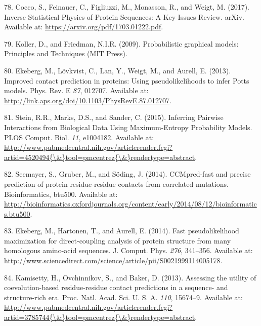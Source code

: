 \documentclass[12pt,a4paper,twoside]{book}
\theoremstyle{definition}
\theoremstyle{definition}
\theoremstyle{remark}
\begin{document}
\hypertarget{ref-Cocco2017}{}
78. Cocco, S., Feinauer, C., Figliuzzi, M., Monasson, R., and Weigt, M.
(2017). Inverse Statistical Physics of Protein Sequences: A Key Issues
Review. arXiv. Available at: \url{https://arxiv.org/pdf/1703.01222.pdf}.

\hypertarget{ref-Koller2009}{}
79. Koller, D., and Friedman, N.I.R. (2009). Probabilistic graphical
models: Principles and Techniques (MIT Press).

\hypertarget{ref-Ekeberg2013}{}
80. Ekeberg, M., Lövkvist, C., Lan, Y., Weigt, M., and Aurell, E.
(2013). Improved contact prediction in proteins: Using pseudolikelihoods
to infer Potts models. Phys. Rev. E \emph{87}, 012707. Available at:
\url{http://link.aps.org/doi/10.1103/PhysRevE.87.012707}.

\hypertarget{ref-Stein2015a}{}
81. Stein, R.R., Marks, D.S., and Sander, C. (2015). Inferring Pairwise
Interactions from Biological Data Using Maximum-Entropy Probability
Models. PLOS Comput. Biol. \emph{11}, e1004182. Available at:
\href{http://www.pubmedcentral.nih.gov/articlerender.fcgi?artid=4520494\%7B/\&\%7Dtool=pmcentrez\%7B/\&\%7Drendertype=abstract}{http://www.pubmedcentral.nih.gov/articlerender.fcgi?artid=4520494\{\textbackslash{}\&\}tool=pmcentrez\{\textbackslash{}\&\}rendertype=abstract}.

\hypertarget{ref-Seemayer2014}{}
82. Seemayer, S., Gruber, M., and Söding, J. (2014). CCMpred-fast and
precise prediction of protein residue-residue contacts from correlated
mutations. Bioinformatics, btu500. Available at:
\url{http://bioinformatics.oxfordjournals.org/content/early/2014/08/12/bioinformatics.btu500}.

\hypertarget{ref-Ekeberg2014}{}
83. Ekeberg, M., Hartonen, T., and Aurell, E. (2014). Fast
pseudolikelihood maximization for direct-coupling analysis of protein
structure from many homologous amino-acid sequences. J. Comput. Phys.
\emph{276}, 341--356. Available at:
\url{http://www.sciencedirect.com/science/article/pii/S0021999114005178}.

\hypertarget{ref-Kamisetty2013}{}
84. Kamisetty, H., Ovchinnikov, S., and Baker, D. (2013). Assessing the
utility of coevolution-based residue-residue contact predictions in a
sequence- and structure-rich era. Proc. Natl. Acad. Sci. U. S. A.
\emph{110}, 15674--9. Available at:
\href{http://www.pubmedcentral.nih.gov/articlerender.fcgi?artid=3785744\%7B/\&\%7Dtool=pmcentrez\%7B/\&\%7Drendertype=abstract}{http://www.pubmedcentral.nih.gov/articlerender.fcgi?artid=3785744\{\textbackslash{}\&\}tool=pmcentrez\{\textbackslash{}\&\}rendertype=abstract}.
\end{document}
